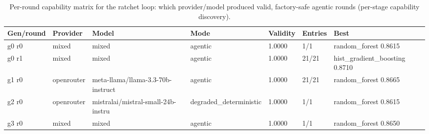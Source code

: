 \begin{table}[H]
\centering\small
\caption{Per-round capability matrix for the ratchet loop: which provider/model produced valid, factory-safe agentic rounds (per-stage capability discovery).}
\label{tab:ratchet-rounds-ratchet-ledger-churn}
\begin{tabular}{lllllll}
\toprule
Gen/round & Provider & Model & Mode & Validity & Entries & Best \\
\midrule
g0 r0 & mixed & mixed & agentic & 1.0000 & 1/1 & random\_forest 0.8615 \\
g0 r1 & mixed & mixed & agentic & 1.0000 & 21/21 & hist\_gradient\_boosting 0.8710 \\
g1 r0 & openrouter & meta-llama/llama-3.3-70b-instruct & agentic & 1.0000 & 21/21 & random\_forest 0.8665 \\
g2 r0 & openrouter & mistralai/mistral-small-24b-instru & degraded\_deterministic & 1.0000 & 1/1 & random\_forest 0.8615 \\
g3 r0 & mixed & mixed & agentic & 1.0000 & 1/1 & random\_forest 0.8650 \\
\bottomrule
\end{tabular}
\end{table}

